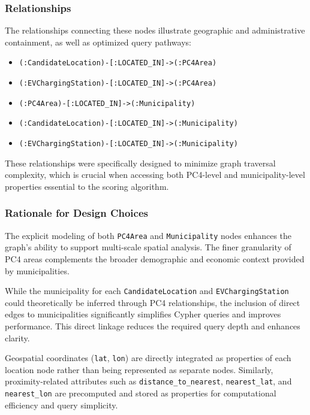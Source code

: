 \documentclass{article}
\begin{document}
\subsubsection{Relationships}

The relationships connecting these nodes illustrate geographic and administrative containment, as well as optimized query pathways:

\begin{itemize}
	\item \texttt{(:CandidateLocation)-[:LOCATED\_IN]->(:PC4Area)}
	\item \texttt{(:EVChargingStation)-[:LOCATED\_IN]->(:PC4Area)}
	\item \texttt{(:PC4Area)-[:LOCATED\_IN]->(:Municipality)}
	\item \texttt{(:CandidateLocation)-[:LOCATED\_IN]->(:Municipality)}
	\item \texttt{(:EVChargingStation)-[:LOCATED\_IN]->(:Municipality)}
\end{itemize}

These relationships were specifically designed to minimize graph traversal complexity, which is crucial when accessing both PC4-level and municipality-level properties essential to the scoring algorithm.

\subsubsection{Rationale for Design Choices}

The explicit modeling of both \texttt{PC4Area} and \texttt{Municipality} nodes enhances the graph's ability to support multi-scale spatial analysis. The finer granularity of PC4 areas complements the broader demographic and economic context provided by municipalities.

While the municipality for each \texttt{CandidateLocation} and \texttt{EVChargingStation} could theoretically be inferred through PC4 relationships, the inclusion of direct edges to municipalities significantly simplifies Cypher queries and improves performance. This direct linkage reduces the required query depth and enhances clarity.

Geospatial coordinates (\texttt{lat}, \texttt{lon}) are directly integrated as properties of each location node rather than being represented as separate nodes. Similarly, proximity-related attributes such as \texttt{distance\_to\_nearest}, \texttt{nearest\_lat}, and \texttt{nearest\_lon} are precomputed and stored as properties for computational efficiency and query simplicity.
\end{document}
